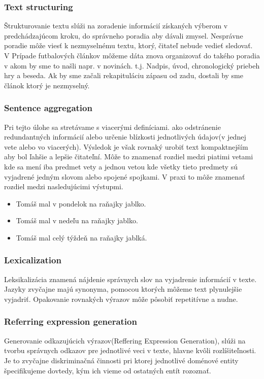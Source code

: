 \subsubsection{Text structuring}
Štrukturovanie textu slúži na zoradenie informácií získaných výberom v predchádzajúcom kroku, do správneho poradia aby dávali zmysel. Nesprávne poradie môže viesť k nezmyselnému textu, ktorý, čitateľ nebude vedieť sledovať. V Prípade futbalových článkov môžeme dáta znova organizovať do takého poradia v akom by sme to našli napr. v novinách\cite{vanderlee_krahmer_wubben_2017_PASS}. t.j. Nadpis, úvod, chronologický priebeh hry a beseda. Ak by sme začali rekapituláciu zápasu od zadu, dostali by sme článok ktorý je nezmyselný.

\subsubsection{Sentence aggregation}
Pri tejto úlohe sa stretávame s viacerými definíciami. ako odstránenie redundantných informácií alebo určenie blízkosti jednotlivých údajov(v jednej vete alebo vo viacerých)\cite{gatt_2018_survey}. Výsledok je však rovnaký urobiť text kompaktnejším aby bol ľahšie a lepšie čitateľní. Môže to znamenať rozdiel medzi piatimi vetami kde sa mení iba predmet vety a jednou vetou kde všetky tieto predmety sú vyjadrené jedným slovom alebo spojené spojkami\cite{Dalianis_1996_lexagr_ord}. V praxi to môže znamenať rozdiel medzi nasledujúcimi výstupmi.

\begin{itemize}
    \item Tomáš mal v pondelok na raňajky jablko.
    \item Tomáš mal v nedeľu na raňajky jablko.
\end{itemize}

\begin{itemize}
    \item Tomáš mal celý týždeň na raňajky jablká.
\end{itemize}

\subsubsection{Lexicalization}
Leksikalizácia znamená nájdenie správnych slov na vyjadrenie informácií v texte. Jazyky zvyčajne majú synonyma, pomocou ktorých môžeme text plynulejšie vyjadriť. Opakovanie rovnakých výrazov môže pôsobiť repetitívne a nudne\cite{gatt_2018_survey}.

\subsubsection{Referring expression generation}
Generovanie odkazujúcich výrazov(Reffering Expression Generation), slúži na tvorbu správnych odkazov pre jednotlivé veci v texte, hlavne kvôli rozlíšiteľnosti. Je to zvyčajne diskriminačná činnosti pri ktorej jednotlivé doménové entity špecifikujeme dovtedy, kým ich vieme od ostatných entít rozoznať\cite{reiter_dale_2000_buildingnlgsystems}.

